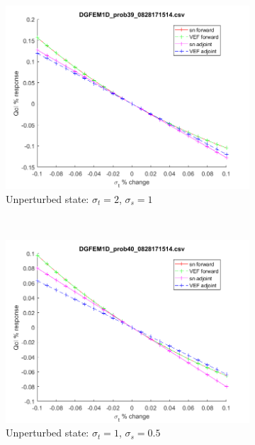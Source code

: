 \documentclass{article}
\newcommand{\sigt}{\sigma_t}
\newcommand{\sigs}{\sigma_s}
\begin{document}
\begin{figure}[H]
\label{InHomoPertt}
\centering
\begin{subfigure}{.65\textwidth}
  \centering
  \includegraphics[width=.98\linewidth]{figures/39sigtSens.png}
  \caption{Unperturbed state: $\sigt=2$, $\sigs=1$}
  \label{fig:sfig1}
\end{subfigure}%
\\
\begin{subfigure}{.65\textwidth}
  \centering
  \includegraphics[width=.98\linewidth]{figures/40sigtSens.png}
  \caption{Unperturbed state: $\sigt=1$, $\sigs=0.5$}
  \label{fig:sfig2}
\end{subfigure}
\\
\begin{subfigure}{.65\textwidth}

\end{subfigure}
\end{figure}
\end{document}
